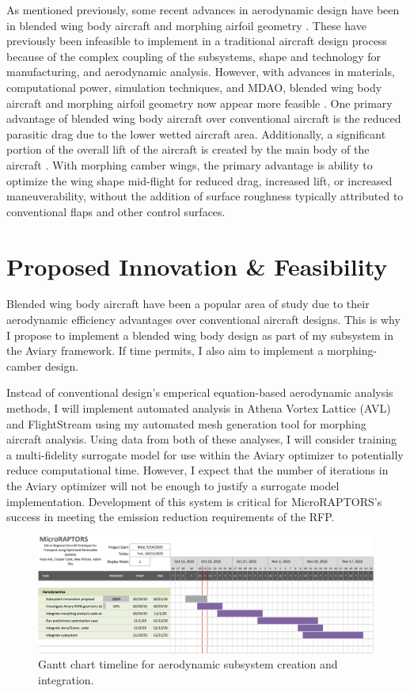 \documentclass[conf]{new-aiaa}
\begin{document}
As mentioned previously, some recent advances in aerodynamic design have been in blended wing body aircraft \cite{handa_recent_2022} and morphing airfoil geometry \cite{coelho_barbosa_aircraft_2023}. These have previously been infeasible to implement in a traditional aircraft design process because of the complex coupling of the subsystems, shape and technology for manufacturing, and aerodynamic analysis. However, with advances in materials, computational power, simulation techniques, and MDAO, blended wing body aircraft and morphing airfoil geometry now appear more feasible \cite{majid_status_2021, handa_recent_2022}. One primary advantage of blended wing body aircraft over conventional aircraft is the reduced parasitic drag due to the lower wetted aircraft area. Additionally, a significant portion of the overall lift of the aircraft is created by the main body of the aircraft \cite{handa_recent_2022}. With morphing camber wings, the primary advantage is ability to optimize the wing shape mid-flight for reduced drag, increased lift, or increased maneuverability, without the addition of surface roughness typically attributed to conventional flaps and other control surfaces.

\section{Proposed Innovation \& Feasibility}
Blended wing body aircraft have been a popular area of study due to their aerodynamic efficiency advantages over conventional aircraft designs. This is why I propose to implement a blended wing body design as part of my subsystem in the Aviary framework. If time permits, I also aim to implement a morphing-camber design. 

Instead of conventional design's emperical equation-based aerodynamic analysis methods, I will implement automated analysis in Athena Vortex Lattice (AVL) and FlightStream using my automated mesh generation tool for morphing aircraft analysis. Using data from both of these analyses, I will consider training a multi-fidelity surrogate model for use within the Aviary optimizer to potentially reduce computational time. However, I expect that the number of iterations in the Aviary optimizer will not be enough to justify a surrogate model implementation. Development of this system is critical for MicroRAPTORS's success in meeting the emission reduction requirements of the RFP.

\begin{figure}[hbt!]
\centering
\includegraphics[width=1\textwidth]{cooper-gantt-chart.png}
\caption{Gantt chart timeline for aerodynamic subsystem creation and integration.}
\label{fig:cooper-gantt-chart}
\end{figure}
\end{document}
